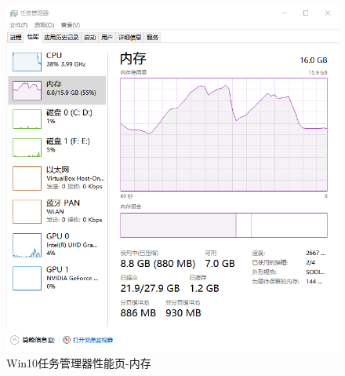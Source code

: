\documentclass[UTF8,twoside,titlepage]{ctexart}
\begin{document}
\begin{landscape}
\hspace{0pt}
\vfill

\begin{multicols}{2}

\begin{figure}[H]
    \centering
    \includegraphics[scale=0.6]{../media/comparison/win10 perfTab mem.png}
    \caption{Win10任务管理器性能页-内存}
    \label{fig:win10mem}
\end{figure}

\columnbreak


\end{multicols}
\end{landscape}
\end{document}
